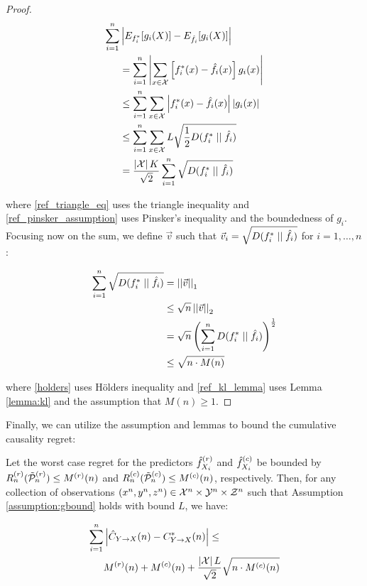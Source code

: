 \begin{proof}
\begin{align}
\sum_{i=1}^n &\left| E_{f^*_i} [g_i(X)] -
    E_{\hat{f}_i}[g_i(X)] \right| \\
&= \sum_{i=1}^n \left| \sum_{x\in\mc{X}}
    \left[ f^*_i(x) - \hat{f}_i(x) \right] g_i(x) \right| \\
&\le \sum_{i=1}^n \sum_{x\in\mc{X}} \left| f^*_i(x) -
    \hat{f}_i(x) \right| \left| g_i(x) \right|
    \label{ref_triangle_eq}\\
&\le \sum_{i=1}^n \sum_{x\in\mc{X}}
    L\sqrt{\frac{1}{2}\kl{f^*_i}{\hat{f}_i}}
    \label{ref_pinsker_assumption}\\
&= \frac{\left|\mc{X}\right| K}{\sqrt{2}} \sum_{i=1}^n
    \sqrt{\kl{f^*_i}{\hat{f}_i}}
\end{align}

\noindent where \eqref{ref_triangle_eq} uses the triangle inequality and \eqref{ref_pinsker_assumption} uses Pinsker's inequality and the boundedness of $g_i$. Focusing now on the sum, we define $\vec{v}$ such that $\vec{v}_i = \sqrt{D(f^*_i \mid \mid \hat{f}_i)}$ for $i=1,\dots,n$:

\begin{align}
\sum_{i=1}^n \sqrt{\kl{f^*_i}{\hat{f}_i}}
&= \left|\left|\vec{v}\right|\right|_1 \\
&\le \sqrt{n}\left|\left|\vec{v}\right|\right|_2 \label{holders}\\
&= \sqrt{n}\left( \sum_{i=1}^n \kl{f^*_i}{\hat{f}_i}
    \right)^{\frac{1}{2}} \\
&\le \sqrt{n \cdot M(n)} \label{ref_kl_lemma}
\end{align}

\noindent where \eqref{holders} uses H\"{o}lders inequality and \eqref{ref_kl_lemma} uses Lemma \ref{lemma:kl} and the assumption that $M(n) \ge 1$.
\end{proof}

Finally, we can utilize the assumption and lemmas to bound the cumulative causality regret:

\begin{theorem}
Let the worst case regret for the predictors $\hat{f}_{X_i}^{(r)}$ and $\hat{f}_{X_i}^{(c)}$ be bounded by $R^{(r)}_n(\tilde{\mathcal{P}}^{(r)}_n) \le M^{(r)}(n)$ and $R^{(c)}_n(\tilde{\mathcal{P}}^{(c)}_n) \le M^{(c)}(n)$, respectively. Then, for any collection of observations $(x^n,y^n,z^n)\in \mathcal{X}^n \times \mathcal{Y}^n \times \mathcal{Z}^n$ such that Assumption \ref{assumption:gbound} holds with bound $L$, we have:

\begin{equation} \label{causal_bound}
\begin{aligned}
\sum_{i=1}^n & \left| \estcyx(n) - \optcyx(n) \right| \le \\
&M^{(r)}(n) + M^{(c)}(n) +
    \frac{\left|\mc{X}\right|L}{\sqrt{2}}\sqrt{n \cdot M^{(c)}(n)}
\end{aligned}
\end{equation}
\end{theorem}

